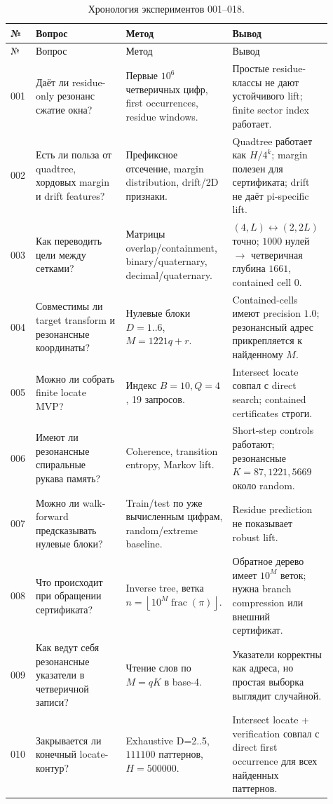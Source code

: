 \documentclass[11pt,a4paper]{article}
\newcommand{\floor}[1]{\left\lfloor #1 \right\rfloor}
\begin{document}
\scriptsize
\begin{longtable}{p{0.06\linewidth}p{0.27\linewidth}p{0.29\linewidth}p{0.29\linewidth}}
\caption{Хронология экспериментов 001--018.}\label{tab:experiments}\\
\toprule
№ & Вопрос & Метод & Вывод \\
\midrule
\endfirsthead
\toprule
№ & Вопрос & Метод & Вывод \\
\midrule
\endhead
001 & Даёт ли residue-only резонанс сжатие окна? & Первые $10^6$ четверичных цифр, first occurrences, residue windows. & Простые residue-классы не дают устойчивого lift; finite sector index работает. \\
002 & Есть ли польза от quadtree, хордовых margin и drift features? & Префиксное отсечение, margin distribution, drift/2D признаки. & Quadtree работает как $H/4^k$; margin полезен для сертификата; drift не даёт pi-specific lift. \\
003 & Как переводить цели между сетками? & Матрицы overlap/containment, binary/quaternary, decimal/quaternary. & $(4,L)\leftrightarrow(2,2L)$ точно; $1000$ нулей $\to$ четверичная глубина $1661$, contained cell $0$. \\
004 & Совместимы ли target transform и резонансные координаты? & Нулевые блоки $D=1..6$, $M=1221q+r$. & Contained-cells имеют precision $1.0$; резонансный адрес прикрепляется к найденному $M$. \\
005 & Можно ли собрать finite locate MVP? & Индекс $B=10,Q=4$, 19 запросов. & Intersect locate совпал с direct search; contained certificates строги. \\
006 & Имеют ли резонансные спиральные рукава память? & Coherence, transition entropy, Markov lift. & Short-step controls работают; резонансные $K=87,1221,5669$ около random. \\
007 & Можно ли walk-forward предсказывать нулевые блоки? & Train/test по уже вычисленным цифрам, random/extreme baseline. & Residue prediction не показывает robust lift. \\
008 & Что происходит при обращении сертификата? & Inverse tree, ветка $n=\floor{10^M\operatorname{frac}(\pi)}$. & Обратное дерево имеет $10^M$ веток; нужна branch compression или внешний сертификат. \\
009 & Как ведут себя резонансные указатели в четверичной записи? & Чтение слов по $M=qK$ в base-4. & Указатели корректны как адреса, но простая выборка выглядит случайной. \\
010 & Закрывается ли конечный locate-контур? & Exhaustive D=2..5, $111100$ паттернов, $H=500000$. & Intersect locate + verification совпал с direct first occurrence для всех найденных паттернов. \\

\end{longtable}
\end{document}
